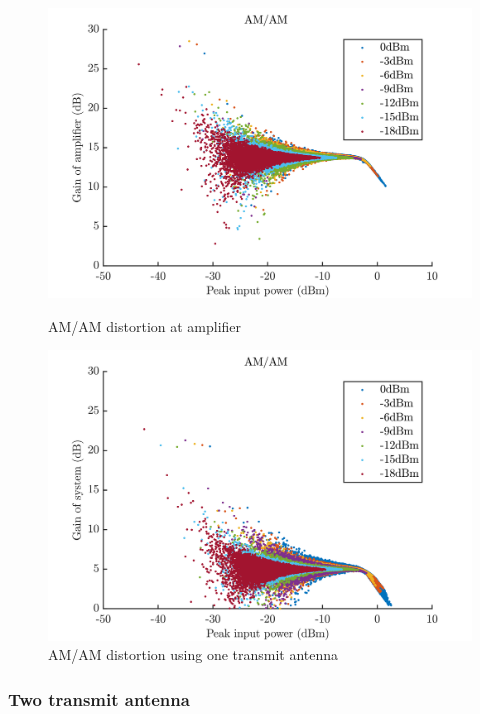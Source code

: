 \begin{figure}[H]
  \centering
  \begin{minipage}[b]{0.5\textwidth}
	\includegraphics[scale = 0.5]{figures/measurement/two_antenna/amplifier_amam.png}
	\caption{AM/AM distortion at amplifier}
    \label{fig:amam_amp}
  \end{minipage}
  \hfill
  \begin{minipage}[b]{0.4\textwidth}
\includegraphics[scale = 0.5]{figures/measurement/two_antenna/one_ant_amam.png}
\caption{AM/AM distortion using one transmit antenna}
    \label{fig:amam_one_ant}
  \end{minipage}
\end{figure}

\subsubsection{Two transmit antenna}

